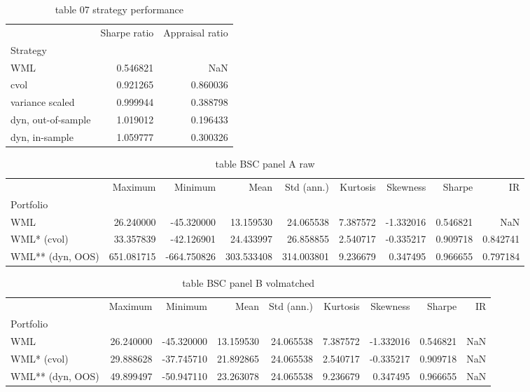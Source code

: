 \documentclass{article}
\begin{document}
\begin{table}[htbp]
  \centering
  \caption{table 07 strategy performance}
  \label{tab:table_07_strategy_performance}
  \begin{tabular}{lrr}
\toprule
 & Sharpe ratio & Appraisal ratio \\
Strategy &  &  \\
\midrule
WML & 0.546821 & NaN \\
cvol & 0.921265 & 0.860036 \\
variance scaled & 0.999944 & 0.388798 \\
dyn, out-of-sample & 1.019012 & 0.196433 \\
dyn, in-sample & 1.059777 & 0.300326 \\
\bottomrule
\end{tabular}
\end{table}

\begin{table}[htbp]
  \centering
  \caption{table BSC panel A raw}
  \label{tab:table_BSC_panel_A_raw}
  \begin{tabular}{lrrrrrrrr}
\toprule
 & Maximum & Minimum & Mean & Std (ann.) & Kurtosis & Skewness & Sharpe & IR \\
Portfolio &  &  &  &  &  &  &  &  \\
\midrule
WML & 26.240000 & -45.320000 & 13.159530 & 24.065538 & 7.387572 & -1.332016 & 0.546821 & NaN \\
WML* (cvol) & 33.357839 & -42.126901 & 24.433997 & 26.858855 & 2.540717 & -0.335217 & 0.909718 & 0.842741 \\
WML** (dyn, OOS) & 651.081715 & -664.750826 & 303.533408 & 314.003801 & 9.236679 & 0.347495 & 0.966655 & 0.797184 \\
\bottomrule
\end{tabular}
\end{table}

\begin{table}[htbp]
  \centering
  \caption{table BSC panel B volmatched}
  \label{tab:table_BSC_panel_B_volmatched}
  \begin{tabular}{lrrrrrrrr}
\toprule
 & Maximum & Minimum & Mean & Std (ann.) & Kurtosis & Skewness & Sharpe & IR \\
Portfolio &  &  &  &  &  &  &  &  \\
\midrule
WML & 26.240000 & -45.320000 & 13.159530 & 24.065538 & 7.387572 & -1.332016 & 0.546821 & NaN \\
WML* (cvol) & 29.888628 & -37.745710 & 21.892865 & 24.065538 & 2.540717 & -0.335217 & 0.909718 & NaN \\
WML** (dyn, OOS) & 49.899497 & -50.947110 & 23.263078 & 24.065538 & 9.236679 & 0.347495 & 0.966655 & NaN \\
\bottomrule
\end{tabular}
\end{table}
\end{document}

